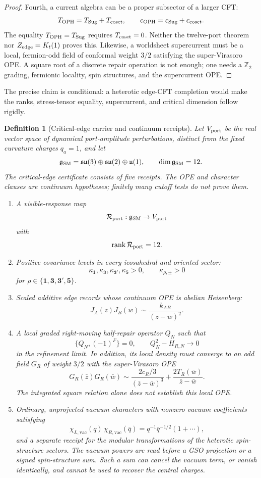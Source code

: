 \documentclass[11pt]{article}
\newtheorem{definition}[theorem]{Definition}
\theoremstyle{remark}
\theoremstyle{plain}
\newcommand{\OPH}{\mathrm{OPH}}
\newcommand{\Z}{\mathbb Z}
\newcommand{\calR}{\mathcal R}
\begin{document}
\begin{proof}
Fourth, a current algebra can be a proper subsector of a larger CFT:
\[
T_{\OPH}=T_{\rm Sug}+T_{\rm coset},
\qquad
c_{\OPH}=c_{\rm Sug}+c_{\rm coset}.
\]
The equality \(T_{\OPH}=T_{\rm Sug}\) requires \(T_{\rm coset}=0\). Neither the twelve-port theorem
nor \(Z_{\rm edge}=K_t(1)\) proves this. Likewise, a worldsheet supercurrent must be a local,
fermion-odd field of conformal weight \(3/2\) satisfying the super-Virasoro OPE. A square root of a
discrete repair operation is not enough; one needs a \(\Z_2\) grading, fermionic locality, spin
structures, and the supercurrent OPE.
\end{proof}

The precise claim is conditional: a heterotic edge-CFT completion would make the ranks,
stress-tensor equality, supercurrent, and critical dimension follow rigidly.

\begin{definition}[Critical-edge carrier and continuum receipts]
Let \(V_{\rm port}\) be the real vector space of dynamical port-amplitude perturbations, distinct
from the fixed curvature charges \(q_a=1\), and let
\[
\mathfrak g_{\rm SM}=
\mathfrak{su}(3)\oplus\mathfrak{su}(2)\oplus\mathfrak u(1),
\qquad
\dim\mathfrak g_{\rm SM}=12.
\]
The critical-edge certificate consists of five receipts. The OPE and
character clauses are continuum hypotheses; finitely many cutoff tests do
not prove them.
\begin{enumerate}[leftmargin=2em]
\item A visible-response map
\[
\calR_{\rm port}:\mathfrak g_{\rm SM}\to V_{\rm port}
\]
with
\[
\operatorname{rank}\calR_{\rm port}=12.
\]
\item Positive covariance levels in every icosahedral and oriented sector:
\[
\kappa_{\mathbf1},\kappa_{\mathbf3},\kappa_{\mathbf3'},\kappa_{\mathbf5}>0,
\qquad
\kappa_{\rho,\pm}>0
\]
for \(\rho\in\{\mathbf1,\mathbf3,\mathbf3',\mathbf5\}\).
\item Scaled additive edge records whose continuum OPE is abelian Heisenberg:
\[
J_A(z)J_B(w)\sim\frac{k_{AB}}{(z-w)^2}.
\]
\item A local graded right-moving half-repair operator \(Q_N\) such that
\[
\{Q_N,(-1)^F\}=0,
\qquad
Q_N^2-H_{R,N}\to0
\]
in the refinement limit.
In addition, its local density must converge to an odd field \(G_R\) of
weight \(3/2\) with the super-Virasoro OPE
\[
 G_R(\bar z)G_R(\bar w)\sim
 \frac{2c_R/3}{(\bar z-\bar w)^3}
 +\frac{2T_R(\bar w)}{\bar z-\bar w}.
\]
The integrated square relation alone does not establish this local OPE.
\item Ordinary, unprojected vacuum characters with nonzero vacuum
coefficients satisfying
\[
\chi_{L,\mathrm{vac}}(q)\,
\chi_{R,\mathrm{vac}}(\bar q)=q^{-1}\bar q^{-1/2}(1+\cdots),
\]
and a separate receipt for the modular transformations of the heterotic
spin-structure sectors. The vacuum powers are read before a GSO projection
or a signed spin-structure sum. Such a sum can cancel the vacuum term, or
vanish identically, and cannot be used to recover the central charges.
\end{enumerate}
\end{definition}
\end{document}
